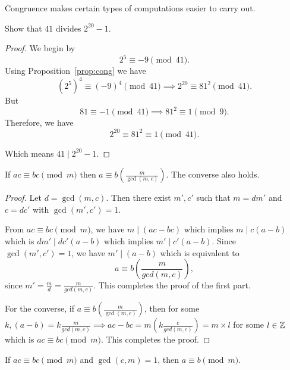 Congruence makes certain types of computations easier to carry out.
\begin{eg}\label{eg:fermatsmotiv}
    Show that $41$ divides  $2^{20} - 1$.
\end{eg}
\begin{proof}
    We begin by \[2^5 \equiv -9 \pmod{41}.\] Using Proposition~\ref{prop:cong} we have \[(2^5)^4 \equiv (-9)^4 \pmod{41} \implies 2^{20} \equiv 81^2 \pmod{41}.\] But \[81 \equiv -1 \pmod{41} \implies 81^2 \equiv 1 \pmod{9}.\]
    Therefore, we have \[2^{20} \equiv 81^2 \equiv 1 \pmod{41}.\]

    Which means $41 \mid 2^{20} -1$.
\end{proof}

\begin{theorem}
    If $ac \equiv bc \pmod{m}$ then $a \equiv b \left(\frac{m}{\gcd(m,c)}\right)$. The converse also holds.
\end{theorem}
\begin{proof}
    Let $d = \gcd(m,c)$. Then there exist  $m',c'$ such that $m = dm'$ and $c = dc'$ with $\gcd(m',c') = 1$.

    From $ac \equiv bc \pmod{m}$, we have $m \mid (ac-bc)$ which implies $m \mid c(a-b)$ which is $dm' \mid dc'(a-b)$ which implies $m' \mid c'(a-b)$. Since $\gcd(m',c') = 1$, we have $m' \mid (a-b)$ which is equivalent to
    \[
     a \equiv b \left(\frac{m}{gcd(m,c)}\right),
    \]
    since $m' = \frac{m}{d} = \frac{m}{gcd(m,c)}.$ This completes the proof of the first part.

    For the converse, if $a \equiv b \left(\frac{m}{\gcd(m,c)}\right)$, then for some $k, (a-b)=k \frac{m}{gcd(m,c)} \implies ac - bc = m \left(k\frac{c}{gcd(m,c)}\right) = m \times l$ for some $l \in \mathbb{Z}$ which is $ac \equiv bc \pmod{m}$. This completes the proof.
\end{proof}
\begin{corollary}
    If $ac \equiv bc \pmod{m}$ and $\gcd(c,m) = 1$, then $a \equiv b \pmod{m}$.
\end{corollary}

